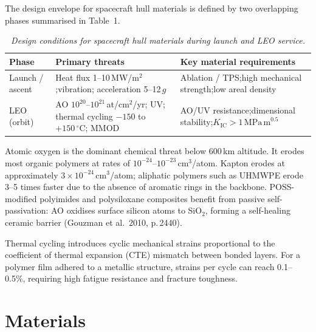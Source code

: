 \documentclass[11pt,a4paper]{article}
\begin{document}
The design envelope for spacecraft hull materials is defined by two overlapping
phases summarised in Table~1.

\begin{table}[h!]
\centering
\caption{\textit{Design conditions for spacecraft hull materials during launch
  and LEO service.}}
\label{tab:environments}
\vspace{4pt}
\begin{tabular}{p{2.2cm} p{3.8cm} p{4.5cm}}
\toprule
\textbf{Phase} & \textbf{Primary threats} & \textbf{Key material requirements} \\
\midrule
Launch / ascent
  & Heat flux 1--10\,MW/m$^{2}$;\newline vibration; acceleration 5--12\,$g$
  & Ablation / TPS;\newline high mechanical strength;\newline low areal density \\
\addlinespace[4pt]
LEO (orbit)
  & AO $10^{20}$--$10^{21}$\,at/cm$^{2}$/yr; UV; thermal cycling
    $-150$ to $+150\,^{\circ}$C; MMOD
  & AO/UV resistance;\newline dimensional stability;\newline $K_{\mathrm{IC}} > 1\,\mathrm{MPa\,m}^{0.5}$ \\
\bottomrule
\end{tabular}
\end{table}

Atomic oxygen is the dominant chemical threat below 600\,km altitude. It erodes
most organic polymers at rates of $10^{-24}$--$10^{-23}$\,cm$^{3}$/atom.
Kapton erodes at approximately $3 \times 10^{-24}$\,cm$^{3}$/atom; aliphatic
polymers such as UHMWPE erode 3--5 times faster due to the absence of aromatic
rings in the backbone. POSS-modified polyimides and polysiloxane composites
benefit from passive self-passivation: AO oxidises surface silicon atoms to
SiO$_{2}$, forming a self-healing ceramic barrier (Gouzman et al.\ 2010, p.\,2440).

Thermal cycling introduces cyclic mechanical strains proportional to the
coefficient of thermal expansion (CTE) mismatch between bonded layers. For a
polymer film adhered to a metallic structure, strains per cycle can reach
0.1--0.5\%, requiring high fatigue resistance and fracture toughness.

\section*{Materials}
\end{document}
